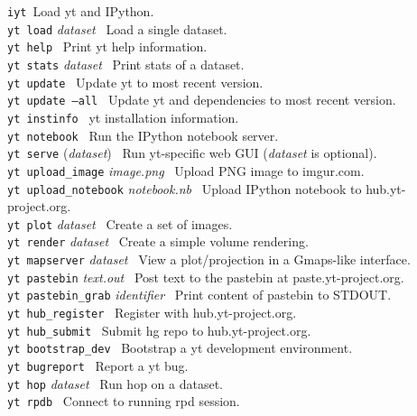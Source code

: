 \documentclass[10pt,landscape]{article}
\begin{document}
\begin{multicols}{3}
\texttt{iyt}\textemdash\ Load yt and IPython. \\
\texttt{yt load} {\it dataset}   \textemdash\ Load a single dataset.  \\
\texttt{yt help} \textemdash\ Print yt help information. \\
\texttt{yt stats} {\it dataset} \textemdash\ Print stats of a dataset. \\
\texttt{yt update} \textemdash\ Update yt to most recent version.\\
\texttt{yt update --all} \textemdash\ Update yt and dependencies to most recent version. \\
\texttt{yt instinfo} \textemdash\ yt installation information. \\
\texttt{yt notebook} \textemdash\ Run the IPython notebook server. \\
\texttt{yt serve} ({\it dataset}) \textemdash\  Run yt-specific web GUI ({\it dataset} is optional).\\
\texttt{yt upload\_image} {\it image.png} \textemdash\ Upload PNG image to imgur.com. \\
\texttt{yt upload\_notebook} {\it notebook.nb} \textemdash\ Upload IPython notebook to hub.yt-project.org.\\
\texttt{yt plot} {\it dataset} \textemdash\ Create a set of images.\\
\texttt{yt render} {\it dataset} \textemdash\ Create a simple
 volume rendering. \\
\texttt{yt mapserver} {\it dataset} \textemdash\ View a plot/projection in a Gmaps-like
 interface. \\
\texttt{yt pastebin} {\it text.out} \textemdash\ Post text to the pastebin at
 paste.yt-project.org. \\ 
\texttt{yt pastebin\_grab} {\it identifier} \textemdash\ Print content of pastebin to
 STDOUT. \\
 \texttt{yt hub\_register} \textemdash\ Register with
hub.yt-project.org. \\
\texttt{yt hub\_submit} \textemdash\ Submit hg repo to
hub.yt-project.org. \\
\texttt{yt bootstrap\_dev} \textemdash\ Bootstrap a yt 
development environment. \\
\texttt{yt bugreport} \textemdash\ Report a yt bug. \\
\texttt{yt hop} {\it dataset} \textemdash\  Run hop on a dataset. \\
\texttt{yt rpdb} \textemdash\ Connect to running rpd 
 session. 


\end{multicols}
\end{document}
